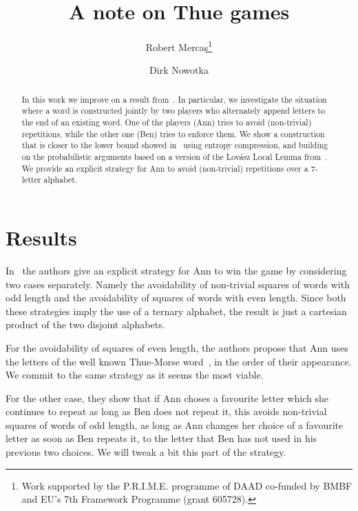 \documentclass[runningheads,fleqn]{llncs}
\begin{document}
\mainmatter

\title{A note on Thue games}


\author{Robert Merca\c{s}\thanks{Work supported by the P.R.I.M.E. programme of  DAAD co-funded by BMBF and EU's 7th Framework Programme (grant 605728).
} \and Dirk Nowotka}




\maketitle

\begin{abstract}
In this work we improve on a result from~\cite{GryKosZma15}. In particular, we investigate the situation where a word is constructed jointly by two players who alternately append letters to the end of an existing word. One of the players (Ann) tries to avoid (non-trivial) repetitions, while the other one (Ben) tries to enforce them. We show a construction that is closer to the lower bound showed in~\cite{GryKozMic13} using entropy compression, and building on the probabilistic arguments based on a version of the Lov\'asz Local Lemma from~\cite{Peg11}. We provide an explicit strategy for Ann to avoid (non-trivial) repetitions over a $7$-letter alphabet.
\end{abstract}


\section{Results}
In~\cite{GryKosZma15} the authors give an explicit strategy for Ann to win the game by considering two cases separately. Namely the avoidability of non-trivial squares of words with odd length and the avoidability of squares of words with even length. Since both these strategies imply the use of a ternary alphabet, the result is just a cartesian product of the two disjoint alphabets.

For the avoidability of squares of even length, the authors propose that Ann uses the letters of the well known Thue-Morse word~\cite{Thu12}, in the order of their appearance. We commit to the same strategy as it seems the most viable. 

For the other case, they show that if Ann choses a favourite letter which she continues to repeat as long as Ben does not repeat it, this avoids non-trivial squares of words of odd length, as long as Ann changes her choice of a favourite letter as soon as Ben repeats it, to the letter that Ben has not used in his previous two choices. We will tweak a bit this part of the strategy.
\end{document}
